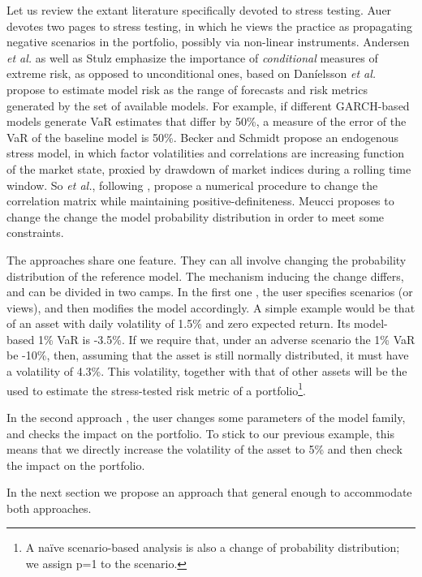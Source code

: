 \documentclass[letter, 12pt]{article}
\newcommand{\etal}{\emph{et al.}}
\begin{document}
Let us review the extant literature specifically devoted to stress testing. Auer \cite{auer2018} devotes two pages to stress testing, in which he views the practice as propagating negative scenarios in the portfolio, possibly via non-linear instruments. Andersen \etal \cite{andersen2013} as well as Stulz \cite{stulz2008} emphasize the importance of \emph{conditional} measures of extreme risk, as opposed to unconditional ones, based on Dan{\'i}elsson \etal \cite{danielsson2016} propose to estimate model risk as the range of forecasts and risk metrics generated by the set of available models. For example, if different GARCH-based models generate VaR estimates that differ by 50\%, a measure of the error of the VaR of the baseline model is 50\%. Becker and Schmidt \cite{becker2013} propose an endogenous stress model, in which factor volatilities and correlations are increasing function of the market state, proxied by drawdown of market indices during a rolling time window. So \etal \cite{so2013}, following \cite{rebonato2000}, propose a numerical procedure to change the correlation matrix while maintaining positive-definiteness. Meucci \cite{meucci2008} proposes to change the change the model probability distribution in order to meet some constraints.

The approaches share one feature. They can all involve changing the probability distribution of the reference model. The mechanism inducing the change differs, and can be divided in two camps. In the first one \cite{fed2013, fed2017, fed2018, meucci2008}, the user specifies scenarios (or views), and then modifies the model accordingly. A simple example would be that of an asset with daily volatility of 1.5\% and zero expected return. Its model-based 1\% VaR is -3.5\%. If we require that, under an adverse scenario the 1\% VaR be -10\%, then, assuming that the asset is still normally distributed, it must have a volatility of 4.3\%. This volatility, together with that of other assets will be the used to estimate the stress-tested risk metric of a portfolio\footnote{A na{\"i}ve scenario-based analysis is also a change of probability distribution; we assign p=1 to the scenario.}.

In the second approach \cite{danielsson2016, so2013, rebonato2000}, the user changes some parameters of the model family, and checks the impact on the portfolio. To stick to our previous example, this means that we directly increase the volatility of the asset to 5\% and then check the impact on the portfolio.

In the next section we propose an approach that general enough to accommodate both approaches.
\end{document}
